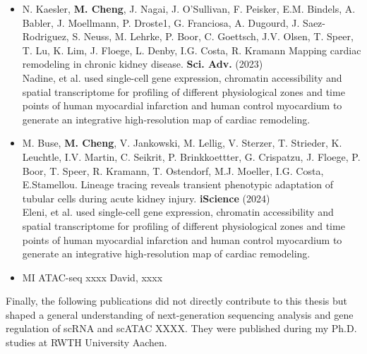 \begin{addmargin}{0.02\textwidth}
	\begin{itemize}
	\item N. Kaesler, \textbf{M. Cheng}, J. Nagai, J. O’Sullivan, F. Peisker, E.M. Bindels, A. Babler, J. Moellmann, P. Droste1, G. Franciosa, A. Dugourd, J. Saez-Rodriguez, S. Neuss, M. Lehrke, P. Boor, C. Goettsch, J.V. Olsen, T. Speer, T. Lu, K. Lim,
J. Floege, L. Denby, I.G. Costa, R. Kramann Mapping cardiac remodeling in chronic kidney disease. \textbf{Sci. Adv.} (2023)\\
		Nadine, et al. used single-cell gene expression, chromatin accessibility and spatial transcriptome for profiling of different physiological zones and time points of human myocardial infarction and human control myocardium to generate an integrative high-resolution map of cardiac remodeling.  
	\end{itemize}
\end{addmargin}

\begin{addmargin}{0.02\textwidth}
	\begin{itemize}
	\item M. Buse, \textbf{M. Cheng}, V. Jankowski, M. Lellig, V. Sterzer, T. Strieder, K. Leuchtle, I.V. Martin, C. Seikrit, P. Brinkkoettter, G. Crispatzu, J. Floege, P. Boor, T. Speer, R. Kramann, T. Ostendorf, M.J. Moeller, I.G. Costa, E.Stamellou. Lineage tracing reveals transient phenotypic adaptation of tubular cells during acute kidney injury. \textbf{iScience} (2024)  \\

		Eleni, et al. used single-cell gene expression, chromatin accessibility and spatial transcriptome for profiling of different physiological zones and time points of human myocardial infarction and human control myocardium to generate an integrative high-resolution map of cardiac remodeling. \\
	\end{itemize}
\end{addmargin}

\begin{addmargin}{0.02\textwidth}
	\begin{itemize}
	\item MI ATAC-seq xxxx
	David, xxxx
	\end{itemize}
\end{addmargin}



Finally, the following publications did not directly contribute to this thesis but shaped a general
understanding of next-generation sequencing analysis and gene regulation of scRNA and scATAC XXXX. They were
published during my Ph.D. studies at RWTH University Aachen.

